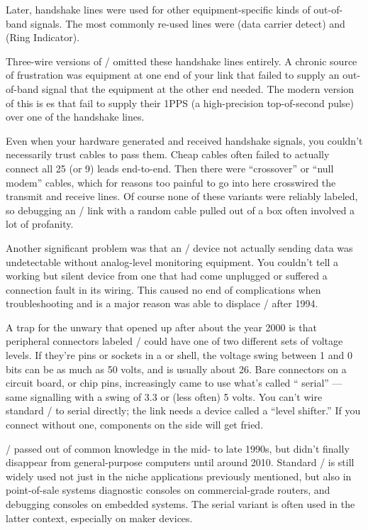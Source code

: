 Later, handshake lines were used for other equipment-specific kinds of
out-of-band signals. The most commonly re-used lines were  (data carrier
detect) and  (Ring Indicator).

Three-wire versions of \RSTTT/ omitted these handshake lines entirely. A chronic
source of frustration was equipment at one end of your link that failed to
supply an out-of-band signal that the equipment at the other end needed. The
modern version of this is es that fail to supply their 1PPS (a
high-precision top-of-second pulse) over one of the handshake lines.

Even when your hardware generated and received handshake signals, you couldn't
necessarily trust cables to pass them. Cheap cables often failed to actually
connect all 25 (or 9) leads end-to-end. Then there were ``crossover'' or ``null
modem'' cables, which for reasons too painful to go into here crosswired the
transmit and receive lines. Of course none of these variants were reliably
labeled, so debugging an \RSTTT/ link with a random cable pulled out of a box
often involved a lot of profanity.

Another significant problem was that an \RSTTT/ device not actually sending data
was undetectable without analog-level monitoring equipment. You couldn't tell a
working but silent device from one that had come unplugged or suffered a
connection fault in its wiring. This caused no end of complications when
troubleshooting and is a major reason  was able to displace \RSTTT/ after
1994.

A trap for the unwary that opened up after about the year 2000 is that
peripheral connectors labeled \RSTTT/ could have one of two different sets of
voltage levels. If they're pins or sockets in a  or  shell, the voltage
swing between 1 and 0 bits can be as much as 50 volts, and is usually about 26.
Bare connectors on a circuit board, or chip pins, increasingly came to use
what's called `` serial'' --- same signalling with a swing of 3.3 or (less
often) 5 volts. You can't wire standard \RSTTT/ to  serial directly; the link
needs a device called a ``level shifter.'' If you connect without one, components
on the  side will get fried.

\RSTTT/ passed out of common knowledge in the mid- to late 1990s, but didn't
finally disappear from general-purpose computers until around 2010. Standard
\RSTTT/ is still widely used not just in the niche applications previously
mentioned, but also in point-of-sale systems diagnostic consoles on
commercial-grade routers, and debugging consoles on embedded systems. The 
serial variant is often used in the latter context, especially on maker
devices.

